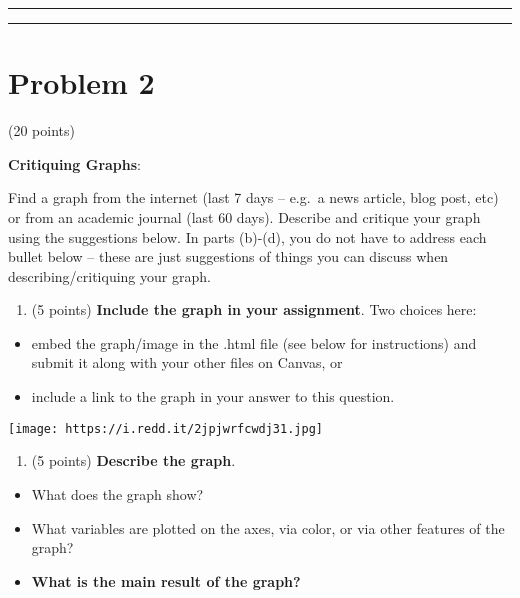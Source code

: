 \documentclass[]{article}
\providecommand{\tightlist}{%
  \setlength{\itemsep}{0pt}\setlength{\parskip}{0pt}}
\begin{document}
\begin{center}\rule{0.5\linewidth}{\linethickness}\end{center}

\begin{center}\rule{0.5\linewidth}{\linethickness}\end{center}

\hypertarget{problem-2}{%
\section{Problem 2}\label{problem-2}}

(20 points)

\textbf{Critiquing Graphs}:

Find a graph from the internet (last 7 days -- e.g.~a news article, blog
post, etc) or from an academic journal (last 60 days). Describe and
critique your graph using the suggestions below. In parts (b)-(d), you
do not have to address each bullet below -- these are just suggestions
of things you can discuss when describing/critiquing your graph.

\begin{enumerate}
\def\labelenumi{\alph{enumi}.}
\tightlist
\item
  (5 points) \textbf{Include the graph in your assignment}. Two choices
  here:
\end{enumerate}

\begin{itemize}
\tightlist
\item
  embed the graph/image in the .html file (see below for instructions)
  and submit it along with your other files on Canvas, or
\item
  include a link to the graph in your answer to this question.
\end{itemize}

\texttt{[image: https://i.redd.it/2jpjwrfcwdj31.jpg]}

\begin{enumerate}
\def\labelenumi{\alph{enumi}.}
\setcounter{enumi}{1}
\tightlist
\item
  (5 points) \textbf{Describe the graph}.
\end{enumerate}

\begin{itemize}
\tightlist
\item
  What does the graph show?
\item
  What variables are plotted on the axes, via color, or via other
  features of the graph?
\item
  \textbf{What is the main result of the graph?}
\end{itemize}
\end{document}
